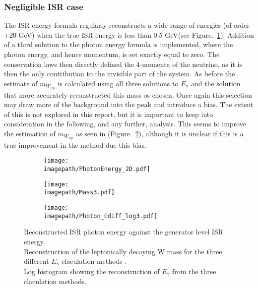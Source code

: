 \subsubsection{Negligible ISR case}
\label{SUBSUBSEC:NoISR}
The ISR energy formula regularly reconstructs a wide range of energies (of order $\pm 20$ GeV) when the true ISR energy is less than 0.5 GeV(see Figure.~\ref{SUBFIG:ZeroPhoton}). Addition of a third solution to the photon energy formula is implemented, where the photon energy, and hence momentum, is set exactly equal to zero. The conservation laws then directly defined the 4-momenta of the neutrino, as it is then the only contribution to the invisible part of the system. As before the estimate of ${m}_{W_{lep}}$ is calculated using all three solutions to $E_{\gamma}$ and the solution that more accurately reconstructed this mass os chosen. Once again this selection may draw more of the background into the peak and introduce a bias. The extent of this is not explored in this report, but it is important to keep into consideration in the following, and any further, analysis. This seems to improve the estimation of ${m}_{W_{lep}}$ as seen in (Figure.~\ref{SUBFIG:Mass3}), although it is unclear if this is a true improvement in the method due this bias.
\begin{figure}
    \begin{subfigure}[t]{0.32\textwidth}
      \centering
      \texttt{[image: \\imagepath/PhotonEnergy\_2D.pdf]}
      \caption{}
      \label{SUBFIG:ZeroPhoton}
    \end{subfigure}
    \begin{subfigure}[t]{0.32\textwidth}
      \centering
      \texttt{[image: \\imagepath/Mass3.pdf]}
      \caption{}
      \label{SUBFIG:Mass3}
    \end{subfigure}
    \begin{subfigure}[t]{0.32\textwidth}
      \centering
      \texttt{[image: \\imagepath/Photon\_Ediff\_log3.pdf]}
      \caption{}
      \label{SUBFIG:Ediff}
    \end{subfigure}
    \caption{
     Reconstructed ISR photon energy against the generator level ISR energy.\\
     Reconstruction of the leptonically decaying W mass for the three different ${E}_{\gamma}$ claculation methods .\\
     Log histogram showing the reconstruction of ${E}_{\gamma}$ from the three claculation methods.
     }
    \label{FIG:ZeroPhoton}
\end{figure}
